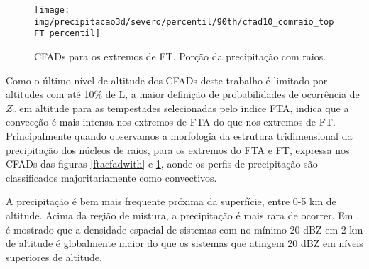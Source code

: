 
\begin{figure}[!ht]
  \centering
  \texttt{[image: img/precipitacao3d/severo/percentil/90th/cfad10\_comraio\_topFT\_percentil]}
  \caption{CFADs para os extremos de FT. Porção da precipitação com raios.}
  \label{ftcfadwith}   
\end{figure} 


Como o último nível de altitude dos CFADs deste trabalho é limitado por altitudes com até 10\% de L, a maior definição de probabilidades de ocorrência de $Z_c$ em altitude para as tempestades selecionadas pelo índice FTA, indica que a convecção é mais intensa nos extremos de FTA do que nos extremos de FT. Principalmente quando observamos a morfologia da estrutura tridimensional da precipitação dos núcleos de raios, para os extremos do FTA e FT, expressa nos CFADs das figuras \ref{ftacfadwith} e \ref{ftcfadwith}, aonde os perfis de precipitação são classificados majoritariamente como convectivos.

A precipitação é bem mais frequente próxima da superfície, entre 0-5 km de altitude. Acima da região de mistura, a precipitação é mais rara de ocorrer. Em \cite{liu2008}, é mostrado que a densidade espacial de sistemas com no mínimo 20 dBZ em 2 km de altitude é globalmente maior do que os sistemas que atingem 20 dBZ em níveis superiores de altitude.




